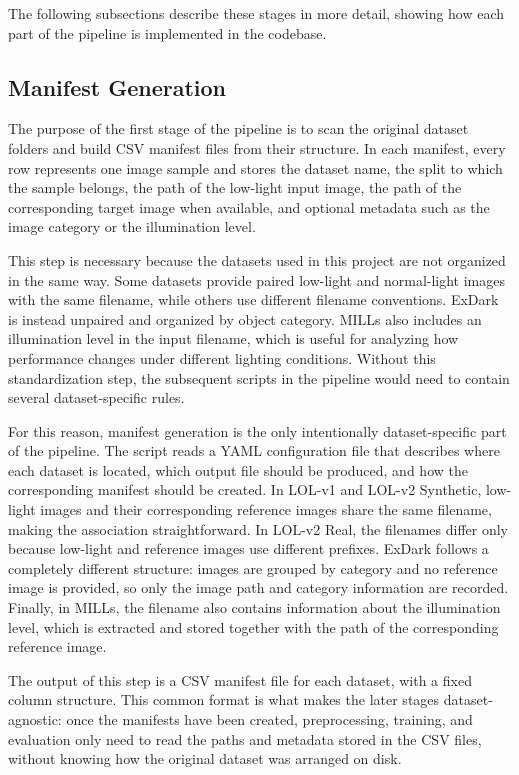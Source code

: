The following subsections describe these stages in more detail, showing how each part of the pipeline is implemented in the codebase.

\subsection{Manifest Generation}
\label{sec:manifest_generation}

The purpose of the first stage of the pipeline is to scan the original dataset folders and build CSV manifest files from their structure. In each manifest, every row represents one image sample and stores the dataset name, the split to which the sample belongs, the path of the low-light input image, the path of the corresponding target image when available, and optional metadata such as the image category or the illumination level.

This step is necessary because the datasets used in this project are not organized in the same way. Some datasets provide paired low-light and normal-light images with the same filename, while others use different filename conventions. ExDark is instead unpaired and organized by object category. MILLs also includes an illumination level in the input filename, which is useful for analyzing how performance changes under different lighting conditions. Without this standardization step, the subsequent scripts in the pipeline would need to contain several dataset-specific rules.

For this reason, manifest generation is the only intentionally dataset-specific part of the pipeline. The script reads a YAML configuration file that describes where each dataset is located, which output file should be produced, and how the corresponding manifest should be created. In LOL-v1 and LOL-v2 Synthetic, low-light images and their corresponding reference images share the same filename, making the association straightforward. In LOL-v2 Real, the filenames differ only because low-light and reference images use different prefixes. ExDark follows a completely different structure: images are grouped by category and no reference image is provided, so only the image path and category information are recorded. Finally, in MILLs, the filename also contains information about the illumination level, which is extracted and stored together with the path of the corresponding reference image.

The output of this step is a CSV manifest file for each dataset, with a fixed column structure. This common format is what makes the later stages dataset-agnostic: once the manifests have been created, preprocessing, training, and evaluation only need to read the paths and metadata stored in the CSV files, without knowing how the original dataset was arranged on disk.

